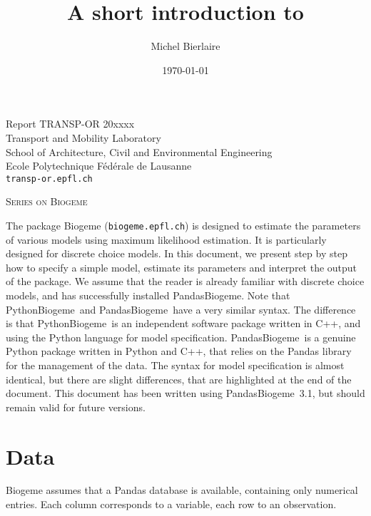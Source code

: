 \documentclass[12pt,a4paper]{article}
\title{A short introduction to \PDBIOGEME}
\author{Michel Bierlaire}
\date{\today}
\newcommand{\PBIOGEME}{PythonBiogeme}
\newcommand{\PDBIOGEME}{PandasBiogeme}
\begin{document}
\begin{titlepage}
\pagestyle{empty}

\maketitle
\vspace{2cm}

\begin{center}
\small Report TRANSP-OR 20xxxx \\ Transport and Mobility Laboratory \\ School of Architecture, Civil and Environmental Engineering \\ Ecole Polytechnique F\'ed\'erale de Lausanne \\ \verb+transp-or.epfl.ch+
\begin{center}
\textsc{Series on Biogeme}
\end{center}
\end{center}


\clearpage
\end{titlepage}

The package Biogeme (\texttt{biogeme.epfl.ch}) is designed to estimate the parameters of
various models using maximum likelihood estimation. It is particularly
designed for discrete choice models. In this document, we present step
by step how to specify a simple model, estimate its parameters and
interpret the output of the  package.  We assume that the
reader is already familiar with discrete choice models, and has
successfully installed \PDBIOGEME. Note that \PBIOGEME\ and \PDBIOGEME\
have a very similar syntax. The difference is that \PBIOGEME\ is an
independent software package written in C++, and using the Python
language for model specification. \PDBIOGEME\ is a genuine Python
package written in Python and C++, that relies on the Pandas library
for the management of the data. The syntax for model specification is
almost identical, but there are slight differences, that are
highlighted at the end of the document.  This document has been written using
\PDBIOGEME\ 3.1, but should remain valid for future versions.  

\section{Data}

Biogeme assumes that a Pandas database is available, containing only numerical
entries. Each column corresponds to a variable, each row to an
observation.
\end{document}
